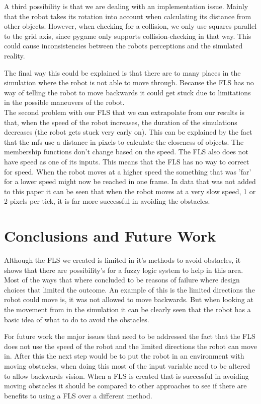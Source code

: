 \documentclass[conference]{IEEEtran}
\begin{document}
A third possibility is that we are dealing with an implementation issue. Mainly that the robot takes its rotation into account when calculating its distance from other objects. However, when checking for a collision, we only use squares parallel to the grid axis, since pygame only supports collision-checking in that way. This could cause inconsistencies between the robots perceptions and the simulated reality.

The final way this could be explained is that there are to many places in the simulation where the robot is not able to move through. Because the FLS has no way of telling the robot to move backwards it could get stuck due to limitations in the possible maneuvers of the robot.\\

The second problem with our FLS that we can extrapolate from our results is that, when the speed of the robot increases, the duration of the simulations decreases (the robot gets stuck very early on). This can be explained by the fact that the mfs use a distance in pixels to calculate the closeness of objects. The membership functions don't change based on the speed. The FLS also does not have speed as one of its inputs. This means that the FLS has no way to correct for speed. When the robot moves at a higher speed the something that was 'far' for a lower speed might now be reached in one frame. In data that was not added to this paper it can be seen that when the robot moves at a very slow speed, 1 or 2 pixels per tick, it is far more successful in avoiding the obstacles.

\section{Conclusions and Future Work}
Although the FLS we created is limited in it's methods to avoid obstacles, it shows that there are possibility's for a fuzzy logic system to help in this area. Most of the ways that where concluded to be reasons of failure where design choices that limited the outcome. An example of this is the limited directions the robot could move is, it was not allowed to move backwards. But when looking at the movement from in the simulation it can be clearly seen that the robot has a basic idea of what to do to avoid the obstacles.

For future work the major issues that need to be addressed the fact that the FLS does not use the speed of the robot and the limited directions the robot can move in. After this the next step would be to put the robot in an environment with moving obstacles, when doing this most of the input variable need to be altered to allow backwards vision. When a FLS is created that is successful in avoiding moving obstacles it should be compared to other approaches to see if there are benefits to using a FLS over a different method.
\end{document}
